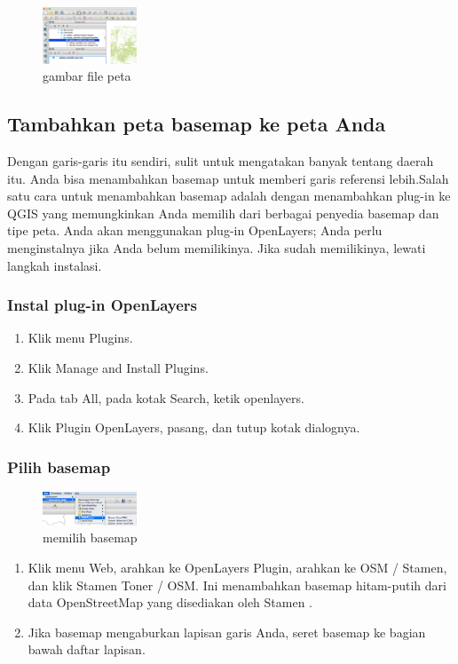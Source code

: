 \begin{figure}[ht]
\centerline{\includegraphics[width=0.25\textwidth]{figures/filepeta}}
\caption{gambar file peta}
\label {filepeta}
\end{figure}

\subsection{Tambahkan peta basemap ke peta Anda}
Dengan garis-garis itu sendiri, sulit untuk mengatakan banyak tentang daerah itu. Anda bisa menambahkan basemap untuk memberi garis referensi lebih.Salah satu cara untuk menambahkan basemap adalah dengan menambahkan plug-in ke QGIS yang memungkinkan Anda memilih dari berbagai penyedia basemap dan tipe peta. Anda akan menggunakan plug-in OpenLayers; Anda perlu menginstalnya jika Anda belum memilikinya. Jika sudah memilikinya, lewati langkah instalasi.

\subsubsection{Instal plug-in OpenLayers}
\begin{enumerate}
\item
Klik menu Plugins.
\item
Klik Manage and Install Plugins.
\item
Pada tab All, pada kotak Search, ketik openlayers.
\item
Klik Plugin OpenLayers, pasang, dan tutup kotak dialognya.
\end{enumerate}

\subsubsection{Pilih basemap}

\begin{figure}[ht]
\centerline{\includegraphics[width=0.25\textwidth]{figures/osmstatement}}
\caption{memilih basemap}
\label {osmstatement}
\end{figure}
\begin{enumerate}
\item
Klik menu Web, arahkan ke OpenLayers Plugin, arahkan ke OSM / Stamen, dan klik Stamen Toner / OSM. Ini menambahkan basemap hitam-putih dari data OpenStreetMap yang disediakan oleh Stamen .
\item
Jika basemap mengaburkan lapisan garis Anda, seret basemap ke bagian bawah daftar lapisan.
\end{enumerate}

